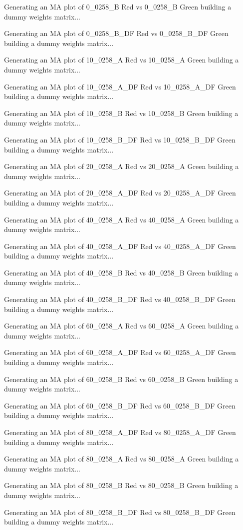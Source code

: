\documentclass[titlepage]{article}
\begin{document}
\begin{Schunk}
\begin{Soutput}
Generating an MA plot of  0_0258_B Red vs 0_0258_B Green 
building a dummy weights matrix... 

Generating an MA plot of  0_0258_B_DF Red vs 0_0258_B_DF Green 
building a dummy weights matrix... 

Generating an MA plot of  10_0258_A Red vs 10_0258_A Green 
building a dummy weights matrix... 

Generating an MA plot of  10_0258_A_DF Red vs 10_0258_A_DF Green 
building a dummy weights matrix... 

Generating an MA plot of  10_0258_B Red vs 10_0258_B Green 
building a dummy weights matrix... 

Generating an MA plot of  10_0258_B_DF Red vs 10_0258_B_DF Green 
building a dummy weights matrix... 

Generating an MA plot of  20_0258_A Red vs 20_0258_A Green 
building a dummy weights matrix... 

Generating an MA plot of  20_0258_A_DF Red vs 20_0258_A_DF Green 
building a dummy weights matrix... 

Generating an MA plot of  40_0258_A Red vs 40_0258_A Green 
building a dummy weights matrix... 

Generating an MA plot of  40_0258_A_DF Red vs 40_0258_A_DF Green 
building a dummy weights matrix... 

Generating an MA plot of  40_0258_B Red vs 40_0258_B Green 
building a dummy weights matrix... 

Generating an MA plot of  40_0258_B_DF Red vs 40_0258_B_DF Green 
building a dummy weights matrix... 

Generating an MA plot of  60_0258_A Red vs 60_0258_A Green 
building a dummy weights matrix... 

Generating an MA plot of  60_0258_A_DF Red vs 60_0258_A_DF Green 
building a dummy weights matrix... 

Generating an MA plot of  60_0258_B Red vs 60_0258_B Green 
building a dummy weights matrix... 

Generating an MA plot of  60_0258_B_DF Red vs 60_0258_B_DF Green 
building a dummy weights matrix... 

Generating an MA plot of  80_0258_A_DF Red vs 80_0258_A_DF Green 
building a dummy weights matrix... 

Generating an MA plot of  80_0258_A Red vs 80_0258_A Green 
building a dummy weights matrix... 

Generating an MA plot of  80_0258_B Red vs 80_0258_B Green 
building a dummy weights matrix... 

Generating an MA plot of  80_0258_B_DF Red vs 80_0258_B_DF Green 
building a dummy weights matrix... 
\end{Soutput}
\end{Schunk}
\end{document}
